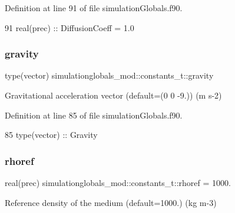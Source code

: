 Definition at line 91 of file simulation\+Globals.\+f90.


\begin{DoxyCode}
91         \textcolor{keywordtype}{real(prec)}   :: DiffusionCoeff = 1.0
\end{DoxyCode}
\mbox{\label{structsimulationglobals__mod_1_1constants__t_abe210fea4268af42f1cb950a1e3b3cfd}} 
\subsubsection{\texorpdfstring{gravity}{gravity}}
{\footnotesize\ttfamily type(vector) simulationglobals\+\_\+mod\+::constants\+\_\+t\+::gravity\hspace{0.3cm}{\ttfamily [private]}}



Gravitational acceleration vector (default=(0 0 -\/9.)) (m s-\/2) 



Definition at line 85 of file simulation\+Globals.\+f90.


\begin{DoxyCode}
85         \textcolor{keywordtype}{type}(vector) :: Gravity
\end{DoxyCode}
\mbox{\label{structsimulationglobals__mod_1_1constants__t_ac95f74b07cc46e86d443d4dd666235c3}} 
\subsubsection{\texorpdfstring{rhoref}{rhoref}}
{\footnotesize\ttfamily real(prec) simulationglobals\+\_\+mod\+::constants\+\_\+t\+::rhoref = 1000.\hspace{0.3cm}{\ttfamily [private]}}



Reference density of the medium (default=1000.) (kg m-\/3) 



